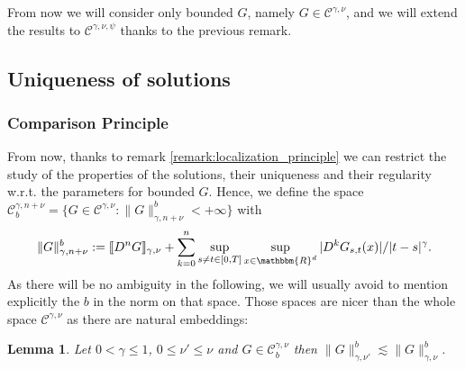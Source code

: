 \documentclass[a4paper,11pt]{article}
\newcommand{\assign}{:=}
\newtheorem{lemma}[theorem]{Lemma}
\newcommand{\CC}{\mathscr C}
\begin{document}
From now we will consider only bounded $G$, namely $G \in \CC^{\gamma , \nu}$,
and we will extend the results to $\CC^{\gamma , \nu , \psi}$ thanks to the
previous remark.

\subsection{Uniqueness of solutions}\label{subsec:uniqueness}

\subsubsection{Comparison Principle}\label{subsec:comparison_principle}

From now, thanks to remark \ref{remark:localization_principle} we can restrict
the study of the properties of the solutions, their uniqueness and their
regularity w.r.t. the parameters for bounded $G$. Hence, we define the
 space
$ \CC^{\gamma ,n+ \nu}_{b} = \{ G \in \CC^{\gamma , \nu} : \| G
   \|^{b}_{\gamma ,n+ \nu} <+ \infty
   \} $
   with $$
   \| G
   \|^{b}_{\gamma ,n+ \nu} \assign \llbracket D^{n} G \rrbracket_{\gamma ,
   \nu} + \sum_{k=0}^{n} \sup_{s \neq t \in [ 0,T ]} \sup_{x \in
   \mathbbm{R}^{d}} | D^{k} G_{s,t} ( x ) | / | t-s |^{\gamma}.
   $$
As there will be no ambiguity in the following, we will usually avoid to
mention explicitly the $b$ in the norm on that space. Those spaces are nicer
than the whole space $\CC^{\gamma , \nu}$ as there are natural embeddings:

\begin{lemma}
  \label{lemma:embedding}Let $0< \gamma \leqslant 1$, $0 \leqslant
  \nu' \leqslant \nu$ and $G \in \CC^{\gamma , \nu}_{b}$ then
  $ \| G \|^{b}_{\gamma , \nu'} \lesssim \| G \|_{\gamma , \nu}^{b} $.
  \end{lemma}
\end{document}
